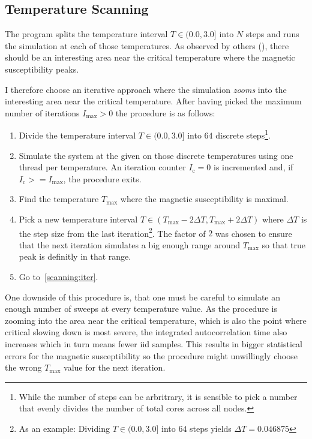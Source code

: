 \subsection{Temperature Scanning}\label{sec:impl:scanning}
	The program splits the temperature interval $T \in (0.0, 3.0]$ into $N$ steps and runs the simulation at each of those temperatures.  As observed by others (\cite{olsson_helicity}), there should be an interesting area near the critical temperature where the magnetic susceptibility peaks.
	
	I therefore choose an iterative approach where the simulation \emph{zooms} into the interesting area near the critical temperature. After having picked the maximum number of iterations $I_\text{max} > 0$ the procedure is as follows:
	\begin{enumerate}
		\item \label{scanning:init} Divide the temperature interval $T \in (0.0, 3.0]$ into $64$ discrete steps\footnote{While the number of steps can be arbritrary, it is sensible to pick a number that evenly divides the number of total cores across all nodes.}.
		\item \label{scanning:iter} Simulate the system at the given on those discrete temperatures using one thread per temperature. An iteration counter $I_\text{c} = 0$ is incremented and, if $I_\text{c} >= I_\text{max}$, the procedure exits.
		\item Find the temperature $T_\text{max}$ where the magnetic susceptibility is maximal.
		\item Pick a new temperature interval $T \in (T_\text{max} - 2 \Delta T,  T_\text{max} + 2 \Delta T)$ where $\Delta T$ is the step size from the last iteration\footnote{As an example: Dividing $T \in (0.0, 3.0]$ into $64$ steps yields $\Delta T = \num{0.046875}$}. The factor of $2$ was chosen to ensure that the next iteration simulates a big enough range around $T_\text{max}$ so that true peak is definitly in that range.
		\item Go to~\cref{scanning:iter}.
	\end{enumerate}
	One downside of this procedure is, that one must be careful to simulate an enough number of sweeps at every temperature value. As the procedure is zooming into the area near the critical temperature, which is also the point where critical slowing down is most severe, the integrated autocorrelation time also increases which in turn means fewer iid samples. This results in bigger statistical errors for the magnetic susceptibility so the procedure might unwillingly choose the wrong $T_\text{max}$ value for the next iteration.
